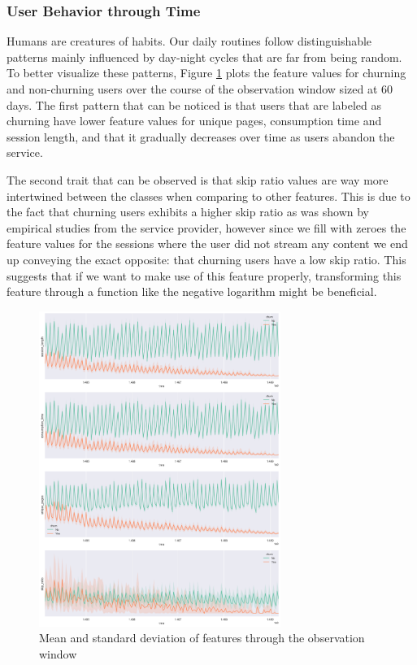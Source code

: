 \documentclass{kththesis}
\begin{document}
\subsubsection{User Behavior through Time}

Humans are creatures of habits. Our daily routines follow distinguishable patterns mainly influenced by day-night cycles that are far from being random. To better visualize these patterns, Figure \ref{fig:featstime} plots the feature values for churning and non-churning users over the course of the observation window sized at 60 days. 
The first pattern that can be noticed is that users that are labeled as churning have lower feature values for unique pages, consumption time and session length, and that it gradually decreases over time as users abandon the service.

The second trait that can be observed is that skip ratio values are way more intertwined between the classes when comparing to other features. This is due to the fact that churning users exhibits a higher skip ratio as was shown by empirical studies from the service provider, however since we fill with zeroes the feature values for the sessions where the user did not stream any content we end up conveying the exact opposite: that churning users have a low skip ratio. This suggests that if we want to make use of this feature properly, transforming this feature through a function like the negative logarithm might be beneficial.
	
	\begin{figure}[h]
    \centering
    \includegraphics[width=0.7\textwidth, natwidth=500bp, natheight=250bp]{figures/features_vs_time.png}
    \caption{Mean and standard deviation of features through the observation window}
    \label{fig:featstime}
	\end{figure}
\end{document}

